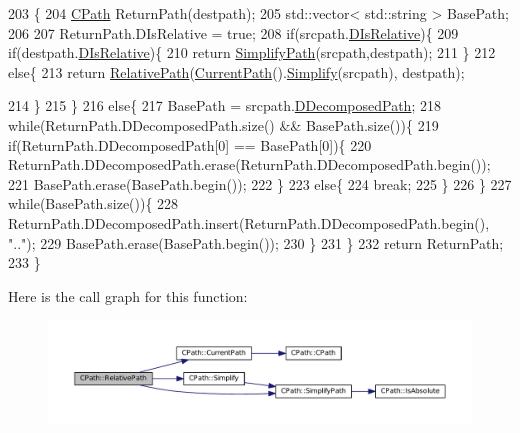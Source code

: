 \begin{DoxyCode}
203                                                                     \{
204     \hyperlink{classCPath}{CPath} ReturnPath(destpath);
205     std::vector< std::string > BasePath;
206 
207     ReturnPath.DIsRelative = \textcolor{keyword}{true};
208     \textcolor{keywordflow}{if}(srcpath.\hyperlink{classCPath_af705ff149bb2281c67afb84fff550eb9}{DIsRelative})\{
209         \textcolor{keywordflow}{if}(destpath.\hyperlink{classCPath_af705ff149bb2281c67afb84fff550eb9}{DIsRelative})\{
210             \textcolor{keywordflow}{return} \hyperlink{classCPath_af0213a2ea0de0498ded236137e759922}{SimplifyPath}(srcpath,destpath);
211         \}
212         \textcolor{keywordflow}{else}\{
213             \textcolor{keywordflow}{return} \hyperlink{classCPath_a76f73670ecc0a434c2f8a1ea0f1a040e}{RelativePath}(\hyperlink{classCPath_a5161b834e754b217ddead2437eaaa223}{CurrentPath}().\hyperlink{classCPath_aa52dcb50c943a8abc8883db5ec43a45e}{Simplify}(srcpath), destpath); 
         
214         \}
215     \}
216     \textcolor{keywordflow}{else}\{
217         BasePath = srcpath.\hyperlink{classCPath_a03ed25209a01e633c107a0c877fc61f8}{DDecomposedPath};    
218         \textcolor{keywordflow}{while}(ReturnPath.DDecomposedPath.size() && BasePath.size())\{
219             \textcolor{keywordflow}{if}(ReturnPath.DDecomposedPath[0] == BasePath[0])\{
220                 ReturnPath.DDecomposedPath.erase(ReturnPath.DDecomposedPath.begin());
221                 BasePath.erase(BasePath.begin());
222             \}
223             \textcolor{keywordflow}{else}\{
224                 \textcolor{keywordflow}{break};
225             \}
226         \}
227         \textcolor{keywordflow}{while}(BasePath.size())\{
228             ReturnPath.DDecomposedPath.insert(ReturnPath.DDecomposedPath.begin(), \textcolor{stringliteral}{".."});
229             BasePath.erase(BasePath.begin());
230         \}  
231     \}
232     \textcolor{keywordflow}{return} ReturnPath;
233 \}
\end{DoxyCode}
Here is the call graph for this function\+:\nopagebreak
\begin{figure}[H]
\begin{center}
\leavevmode
\includegraphics[width=350pt]{classCPath_a76f73670ecc0a434c2f8a1ea0f1a040e_cgraph}
\end{center}
\end{figure}

